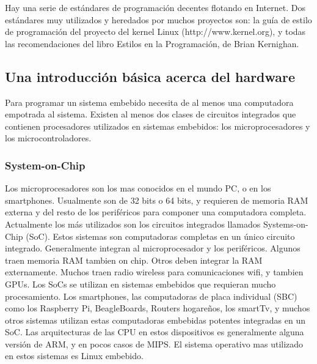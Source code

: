 \documentclass[output=paper, 
colorlinks,
citecolor=brown,
newtxmath
]{langscibook}
\begin{document}
Hay una serie de estándares de programación decentes flotando en Internet. 
Dos estándares muy utilizados y heredados por muchos proyectos son: 
la guía de estilo de programación del proyecto del kernel Linux (http://www.kernel.org),
y todas las recomendaciones del libro Estilos en la Programación, de Brian Kernighan.




\subsection {Una introducción básica acerca del hardware}

Para programar un sistema embebido necesita de al menos una computadora
empotrada al sistema.
Existen al menos dos clases de circuitos integrados que contienen
procesadores utilizados en sistemas embebidos: los microprocesadores y los microcontroladores.

\subsubsection{System-on-Chip}
Los microprocesadores son los mas conocidos en el mundo PC, o en los smartphones.
Usualmente son de 32 bits o 64 bits, y requieren de memoria RAM externa y del resto
de los periféricos para componer una computadora completa.
Actualmente los más utilizados son los circuitos integrados llamados
Systems-on-Chip (SoC). Estos sistemas son computadoras completas en un 
único circuito integrado. Generalmente integran al microprocesador
y los periféricos. Algunos traen memoria RAM tambien on chip.
Otros deben integrar la RAM externamente. Muchos traen radio
wireless para comunicaciones wifi, y tambien GPUs.
Los SoCs se utilizan en sistemas embebidos que requieran
mucho procesamiento. Los smartphones, las computadoras de placa individual
(SBC) como los Raspberry Pi, BeagleBoards, Routers hogareños, los smartTv,
y muchos otros sistemas utilizan estas computadoras embebidas potentes 
integradas en un SoC.
Las arquitecturas de las CPU en estos dispositivos es generalmente
alguna versión de ARM, y en pocos casos de MIPS.
El sistema operativo mas utilizado en estos sistemas es Linux embebido.
\end{document}
